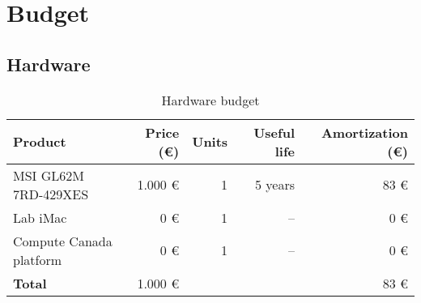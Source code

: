 \section{Budget}
\subsection{Hardware}
\begin{frame}{\insertsubsec}
  \begin{table}[H]
    \centering
    \footnotesize
    \begin{tabular}{|p{3cm}|r|r|r|r|}
      \hline
      \textbf{Product} & \textbf{Price (\euro)} & \textbf{Units} & \textbf{Useful life} 
      & \textbf{Amortization (\euro)} \\ \hline\hline
  
      MSI GL62M 7RD-429XES & 1.000 \euro & 1 & 5 years & 83 \euro \\ \hline
      Lab iMac & 0 \euro & 1 & -- & 0 \euro \\ \hline
      Compute Canada platform & 0 \euro & 1 & -- & 0 \euro \\ \hline
  
      \hline\hline
      \textbf{Total} & 1.000 \euro & \multicolumn{2}{|c|}{} & 83 \euro \\ \hline
    \end{tabular}
    \caption{Hardware budget \label{tab:hardware-budget}}
  \end{table}
\end{frame}

